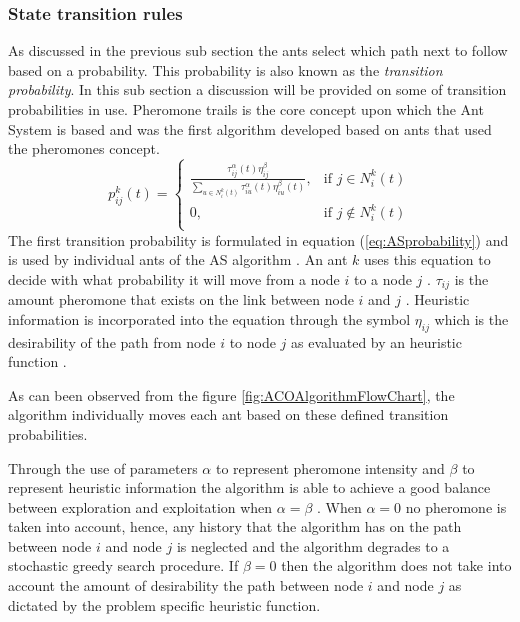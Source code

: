 \subsubsection{State transition rules}
 As discussed in the previous sub section the ants select which path next to follow based on a probability. This probability is also known as the \emph{transition probability}. In this sub section a discussion will be provided on some of transition probabilities in use. Pheromone trails is the core concept upon which the Ant System is based and was the first algorithm developed based on ants that used the pheromones concept\cite{CompuIntelligenceIntro}. 
\begin{equation}
\label{eq:ASprobability}
p^k_{ij}(t) =
\begin{cases}
	\frac{\tau^{\alpha}_{ij}(t)\eta^{\beta}_{ij}}{\sum_{u \in N^k_i(t)} {\tau^{\alpha}_{iu}(t)\eta^{\beta}_{iu}(t)}}, &\text{if $j \in N^k_i(t)$}\\
	0, &\text{if $j \notin N^k_i(t)$}\\
\end{cases}
\end{equation}
The first transition probability is formulated in equation (\ref{eq:ASprobability}) and is used by individual ants of the AS algorithm \cite{CompuIntelligenceIntro,AntSurvey}. An ant $k$ uses this equation to decide with what probability it will move from a node $i$ to a node $j$ \cite{CompuIntelligenceIntro}. $\tau_{ij}$ is the amount pheromone that exists on the link between node $i$ and $j$ \cite{CompuIntelligenceIntro,AntsAndStigmergy}. Heuristic information is incorporated into the equation through the symbol $\eta_{ij}$ which is the desirability of the path from node $i$ to node $j$ as evaluated by an heuristic function \cite{CompuIntelligenceIntro,AntsAndStigmergy}. 

As can been observed from the figure \ref{fig:ACOAlgorithmFlowChart}, the algorithm individually moves each ant based on these defined transition probabilities.

Through the use of parameters $\alpha$ to represent pheromone intensity and $\beta$ to represent heuristic information the algorithm is able to achieve a good balance between exploration and exploitation when $\alpha=\beta$ \cite{CompuIntelligenceIntro}. When $\alpha = 0$ no pheromone is taken into account, hence, any history that the algorithm has on the path between node $i$ and node $j$ is neglected and the algorithm degrades to a stochastic greedy search procedure. If $\beta = 0$ then the algorithm does not take into account the amount of desirability the path between node $i$ and node $j$ as dictated by the problem specific heuristic function.

